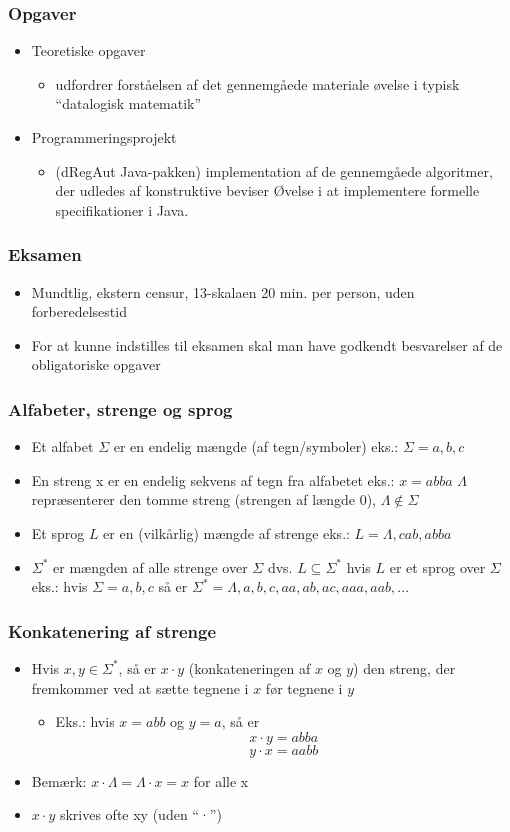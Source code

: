 \documentclass[]{beamer}
\begin{document}
\begin{frame}
\frametitle{Opgaver}
\begin{itemize}
\item Teoretiske opgaver
\begin{itemize}
\item udfordrer forståelsen af det 
gennemgåede materiale
øvelse i typisk “datalogisk matematik”
\end{itemize}
\item Programmeringsprojekt 
\begin{itemize}
\item (dRegAut Java-pakken)
implementation af de gennemgåede algoritmer, der udledes af konstruktive beviser
Øvelse i at implementere formelle specifikationer i Java.
\end{itemize}
\end{itemize}
\end{frame}

\begin{frame}
\frametitle{Eksamen}
\begin{itemize}
\item Mundtlig, ekstern censur, 13-skalaen
20 min. per person, uden forberedelsestid 
\item For at kunne indstilles til eksamen skal man have godkendt besvarelser af de obligatoriske opgaver
\end{itemize}
\end{frame}

\begin{frame}
\frametitle{Alfabeter, strenge og sprog}
\begin{itemize}
\item 
Et alfabet $Σ$ er en endelig mængde (af tegn/symboler)
eks.:  $Σ={a,b,c}$
\item
En streng x er en endelig sekvens af tegn fra alfabetet
eks.:  $x=abba$
$Λ$ repræsenterer den tomme streng (strengen af længde 0), $Λ∉Σ$
\item
Et sprog $L$ er en (vilkårlig) mængde af strenge
eks.:  $L={Λ,cab,abba}$
\item
$Σ^*$ er mængden af alle strenge over $Σ$
dvs. $L⊆Σ^*$ hvis $L$ er et sprog over $Σ$
eks.:  hvis $Σ={a,b,c}$ så er $Σ^*={Λ,a,b,c,aa,ab,ac,aaa,aab,...}$
\end{itemize}
\end{frame}

\begin{frame}
\frametitle{Konkatenering af strenge}
\begin{itemize}
\item Hvis $x,y∈Σ^*$, så er $x·y$ (konkateneringen af $x$ og $y$) den streng, der fremkommer ved at sætte tegnene i $x$ før tegnene i $y$
\begin{itemize}
\item Eks.:  hvis  $x=abb$  og  $y=a$, så er 
\[x·y=abba\]
\[y·x=aabb\]

\end{itemize}

\item Bemærk:  $x·Λ=Λ·x=x$  for alle x
\item $x·y$ skrives ofte xy (uden “·”)
\end{itemize}
\end{frame}
\end{document}
